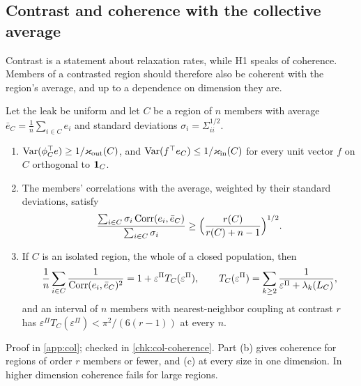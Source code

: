 \subsection{Contrast and coherence with the collective average}\label{sec:col-coherence}

Contrast is a statement about relaxation rates, while H1 speaks of coherence. Members of a contrasted region should therefore also be coherent with the region's average, and up to a dependence on dimension they are.

\begin{proposition}\label{prop:col-coherence-average}
Let the leak be uniform and let $C$ be a region of $n$ members with average $\bar e_C=\frac1n\sum_{i\in C}e_i$ and standard deviations $\sigma_i=\Sigma_{ii}^{1/2}$.
\begin{enumerate}
\item[(a)] $\operatorname{Var}(\phi_C^\top e)\ge1/\varkappa_{\mathrm{out}}(C)$, and $\operatorname{Var}(f^\top e_C)\le1/\varkappa_{\mathrm{in}}(C)$ for every unit vector $f$ on $C$ orthogonal to $\mathbf{1}_C$.
\item[(b)] The members' correlations with the average, weighted by their standard deviations, satisfy
\begin{equation}\label{eq:col-coherence}
\frac{\sum_{i\in C}\sigma_i\operatorname{Corr}(e_i,\bar e_C)}{\sum_{i\in C}\sigma_i}\ge\Bigl(\frac{r(C)}{r(C)+n-1}\Bigr)^{1/2}.
\end{equation}
\item[(c)] If $C$ is an isolated region, the whole of a closed population, then
\[
\frac1n\sum_{i\in C}\frac1{\operatorname{Corr}(e_i,\bar e_C)^2}=1+\varepsilon^\Pi T_C(\varepsilon^\Pi),\qquad T_C(\varepsilon^\Pi)=\sum_{k\ge2}\frac1{\varepsilon^\Pi+\lambda_k(L_C)},
\]
and an interval of $n$ members with nearest-neighbor coupling at contrast $r$ has $\varepsilon^\Pi T_C(\varepsilon^\Pi)<\pi^2/(6(r-1))$ at every $n$.
\end{enumerate}
\end{proposition}
Proof in \cref{app:col}; checked in \cref{chk:col-coherence}. Part (b) gives coherence for regions of order $r$ members or fewer, and (c) at every size in one dimension. In higher dimension coherence fails for large regions.

